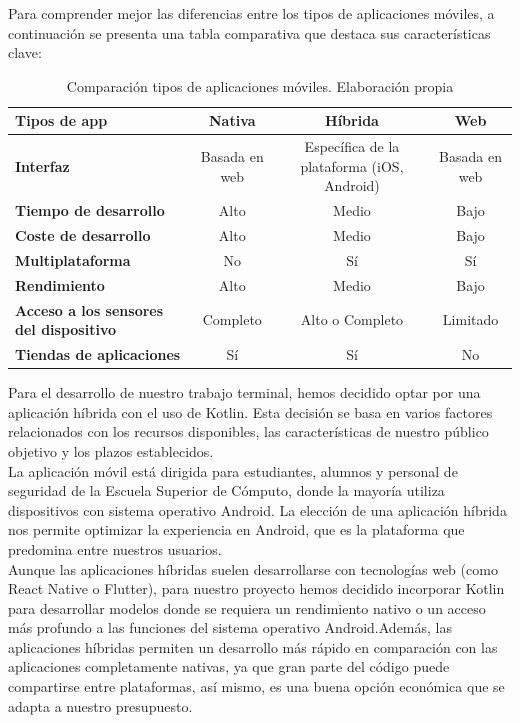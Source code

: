 Para comprender mejor las diferencias entre los tipos de aplicaciones móviles, a continuación se presenta una tabla comparativa que destaca sus características clave:
\newpage

\begin{table}[h!]
	\centering
	\begin{tabular}{|l|c|c|c|}
		\hline
		\textbf{Tipos de app} & \textbf{Nativa} & \textbf{Híbrida} & \textbf{Web} \\ \hline
		\textbf{Interfaz} & Basada en web & Específica de la plataforma (iOS, Android) & Basada en web \\ \hline
		\textbf{Tiempo de desarrollo} & Alto & Medio & Bajo \\ \hline
		\textbf{Coste de desarrollo} & Alto & Medio & Bajo \\ \hline
		\textbf{Multiplataforma} & No & Sí & Sí \\ \hline
		\textbf{Rendimiento} & Alto & Medio & Bajo \\ \hline
		\textbf{Acceso a los sensores del dispositivo} & Completo & Alto o Completo & Limitado \\ \hline
		\textbf{Tiendas de aplicaciones} & Sí & Sí & No \\ \hline
	\end{tabular}
	\caption{Comparación tipos de aplicaciones móviles. Elaboración propia}
	\label{tab:tipos_apps}
\end{table}

Para el desarrollo de nuestro trabajo terminal, hemos decidido optar por una aplicación híbrida con el uso de Kotlin. Esta decisión se basa en varios factores relacionados con los recursos disponibles, las características de nuestro público objetivo y los plazos establecidos. \\

La aplicación móvil está dirigida para estudiantes, alumnos y personal de seguridad de la Escuela Superior de Cómputo, donde la mayoría utiliza dispositivos con sistema operativo Android. La elección de una aplicación híbrida nos permite optimizar  la experiencia en Android, que es la plataforma que predomina entre nuestros usuarios. \\

Aunque las aplicaciones híbridas suelen desarrollarse con tecnologías web (como React Native o Flutter), para nuestro proyecto hemos decidido incorporar Kotlin para desarrollar modelos donde se requiera un rendimiento nativo o un acceso más profundo a las funciones del sistema operativo Android.Además, las aplicaciones híbridas permiten un desarrollo más rápido en comparación con las aplicaciones completamente nativas, ya que gran parte del código puede compartirse entre plataformas, así mismo, es una buena opción económica que se adapta a nuestro presupuesto. 

